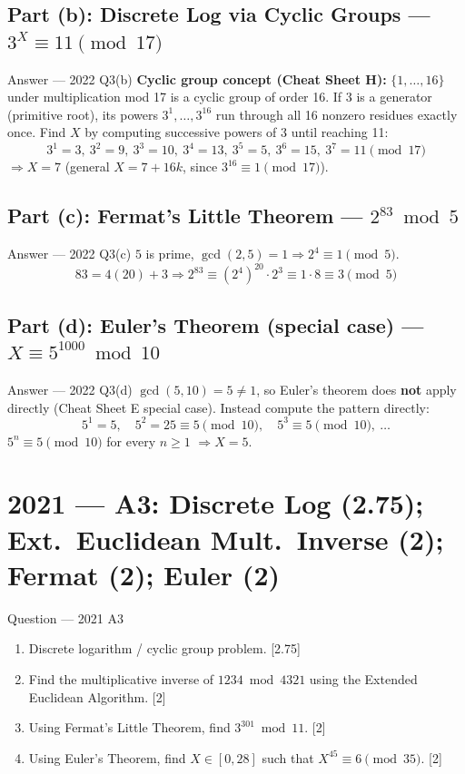 \documentclass[12pt,a4paper]{article}
\begin{document}
\subsection{Part (b): Discrete Log via Cyclic Groups --- $3^X\equiv11\pmod{17}$}
\begin{solbox}{Answer --- 2022 Q3(b)}
\textbf{Cyclic group concept (Cheat Sheet H):} $\{1,\dots,16\}$ under multiplication mod 17 is a cyclic group of order 16. If 3 is a generator (primitive root), its powers $3^1,\dots,3^{16}$ run through all 16 nonzero residues exactly once. Find $X$ by computing successive powers of 3 until reaching 11:
\[
3^1=3,\ 3^2=9,\ 3^3=10,\ 3^4=13,\ 3^5=5,\ 3^6=15,\ 3^7=\boxed{11}\pmod{17}
\]
$\Rightarrow X=7$ (general $X=7+16k$, since $3^{16}\equiv1\pmod{17}$).
\end{solbox}

\subsection{Part (c): Fermat's Little Theorem --- $2^{83} \bmod 5$}
\begin{solbox}{Answer --- 2022 Q3(c)}
$5$ is prime, $\gcd(2,5)=1 \Rightarrow 2^4\equiv1\pmod5$.
\[
83=4(20)+3 \Rightarrow 2^{83}\equiv(2^4)^{20}\cdot2^3\equiv1\cdot8\equiv\boxed{3}\pmod5
\]
\end{solbox}

\subsection{Part (d): Euler's Theorem (special case) --- $X\equiv5^{1000}\bmod10$}
\begin{solbox}{Answer --- 2022 Q3(d)}
$\gcd(5,10)=5\neq1$, so Euler's theorem does \textbf{not} apply directly (Cheat Sheet E special case). Instead compute the pattern directly:
\[
5^1=5,\quad 5^2=25\equiv5\pmod{10},\quad 5^3\equiv5\pmod{10},\ \dots
\]
$5^n\equiv5\pmod{10}$ for every $n\geq1$ $\Rightarrow X=\boxed{5}$.
\end{solbox}

\newpage
\section{2021 --- A3: Discrete Log (2.75); Ext.\ Euclidean Mult.\ Inverse (2); Fermat (2); Euler (2)}

\begin{qbox}{Question --- 2021 A3}
\begin{enumerate}[label=(\alph*)]
  \item Discrete logarithm / cyclic group problem. \hfill [2.75]
  \item Find the multiplicative inverse of $1234 \bmod 4321$ using the Extended Euclidean Algorithm. \hfill [2]
  \item Using Fermat's Little Theorem, find $3^{301} \bmod 11$. \hfill [2]
  \item Using Euler's Theorem, find $X \in [0,28]$ such that $X^{45} \equiv 6 \pmod{35}$. \hfill [2]
\end{enumerate}
\end{qbox}
\end{document}

